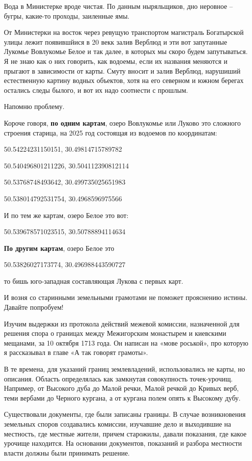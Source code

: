 Вода в Министерке вроде чистая. По данным ныряльщиков, дно неровное – бугры, какие-то проходы, заиленные ямы.

От Министерки на восток через ревущую транспортом магистраль Богатырской улицы лежит появившйися в 20 векк залив Верблюд и эти вот запутанные Лукомье Вовлукомье Белое и так далее, в которых мы скоро будем запутываться. Я не знаю как о них говорить, как водоемы, если их названия меняются и прыгают в зависимости от карты. Смуту вносит и залив Верблюд, нарушиший естественную картину водных объектов, хотя на его северном и южном берегах остались следы былого, и вот их надо соотнести с прошлым.

Напомню проблему. 

Короче говоря, \textbf{по одним  картам}, озеро Вовлукомье или Луково это сложного строения старица, на 2025 год состоящая из водоемов по координатам:

50.54224231150151, 30.49814715789782

50.540496801211226, 30.504112390812114

50.53768748493642, 30.499735025651983

50.538014792531754, 30.4968596975566

И по тем же картам, озеро Белое это вот:

50.539678571023515, 30.50788894114634

\textbf{По другим картам}, озеро Белое это

50.53826027173774, 30.496988443590727

то бишь юго-западная составляющая Лукова с первых карт.

И возня со старинными земельными грамотами не поможет прояснению истины. Давайте попробуем!

Изучим выдержки из протокола действий межевой комиссии, назначенной для решения спора о границах между Межигорским монастырем и киевскими мещанами, за 10 октября 1713 года\cite{sbornikmat}. Он написан на «мове роськой», про которую я рассказывал в главе «А так говорят грамоты».

В те времена, для указаний границ землевладений, использовались не карты, но описания. Область определялась как замкнутая совокупность точек-урочищ. Например, от Высокого дуба до Малой речки, Малой речкой до Кривых верб, теми вербами до Черного кургана, а от кургана полем опять к Высокому дубу.

Существовали документы, где были записаны границы. В случае возникновения земельных споров создавались комиссии, изучавшие дело и выходившие на местность, где местные жители, причем старожилы, давали показания, где какое урочище находится. На основании документов, показаний и разбора местности власти должны были принимать решение.

